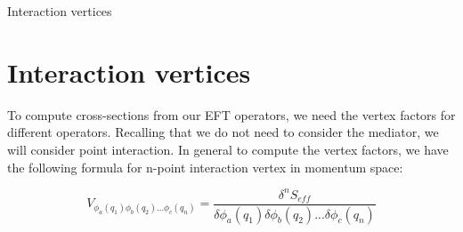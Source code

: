\documentclass[11pt]{beamer}
\begin{document}
%
%
%
%




\begin{frame}{Interaction vertices}

\section{Interaction vertices}
To compute cross-sections from our EFT operators, we need the vertex factors for different operators. Recalling that we do not need to consider the mediator, we will consider point interaction.
In general to compute the vertex factors, we have the following formula for n-point interaction vertex in momentum space:

\begin{equation*}
V_{\phi_a(q_1) \phi_b(q_2)...\phi_c(q_n)} = \frac{\delta^nS_{eff}}{\delta \phi_a(q_1) \delta\phi_b(q_2)... \delta \phi_c(q_n)}
\end{equation*}

\end{frame}
\end{document}
